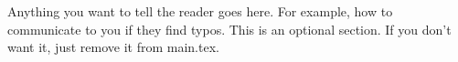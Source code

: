 \begin{noteforthereader}
Anything you want to tell the reader goes here. For example, how to communicate to you if they find typos.
This is an optional section.
If you don't want it, just remove it from main.tex.
\end{noteforthereader}